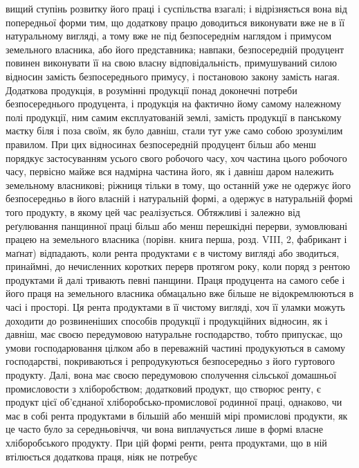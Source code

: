 \parcont{}  %
вищий ступінь розвитку його праці і суспільства взагалі; і відрізняється вона
від попередньої форми тим, що додаткову працю доводиться виконувати вже
не в її натуральному вигляді, а тому вже не під безпосереднім наглядом і
примусом земельного власника, або його представника; навпаки, безпосередній
продуцент повинен виконувати її на свою власну відповідальність, примушуваний
силою відносин замість безпосереднього примусу, і постановою закону замість
нагая. Додаткова продукція, в розумінні продукції понад доконечні потреби
безпосереднього продуцента, і продукція на фактично йому самому належному
полі продукції, ним самим експлуатованій землі, замість продукції в панському
маєтку біля і поза своїм, як було давніш, стали тут уже само собою зрозумілим
правилом. При цих відносинах безпосередній продуцент більш або менш
порядкує застосуванням усього свого робочого часу, хоч частина цього робочого
часу, первісно майже вся надмірна частина його, як і давніш даром належить
земельному власникові; ріжниця тільки в тому, що останній уже не
одержує його безпосередньо в його власній і натуральній формі, а одержує в
натуральній формі того продукту, в якому цей час реалізується. Обтяжливі і
залежно від реґулювання панщинної праці більш або менш перешкідні перерви,
зумовлювані працею на земельного власника (порівн. книга перша, розд. VIII, 2,
фабрикант і маґнат) відпадають, коли рента продуктами є в чистому вигляді
або зводиться, принаймні, до нечисленних коротких перерв протягом року,
коли поряд з рентою продуктами й далі тривають певні панщини. Праця продуцента
на самого себе і його праця на земельного власника обмацально
вже більше не відокремлюються в часі і просторі. Ця рента продуктами в її
чистому вигляді, хоч її уламки можуть доходити до розвиненіших способів
продукції і продукційних відносин, як і давніш, має своєю передумовою натуральне
господарство, тобто припускає, що умови господарювання цілком або в
переважній частині продукуються в самому господарстві, покриваються і репродукуються
безпосередньо з його гуртового продукту. Далі, вона має своєю передумовою
сполучення сільської домашньої промисловости з хліборобством; додатковий
продукт, що створює ренту, є продукт цієї об’єднаної хліборобсько-промислової
родинної праці, однаково, чи має в собі рента продуктами в більшій або
меншій мірі промислові продукти, як це часто було за середньовіччя, чи вона
виплачується лише в формі власне хліборобського продукту. При цій формі
ренти, рента продуктами, що в ній втілюється додаткова праця, ніяк не потребує
